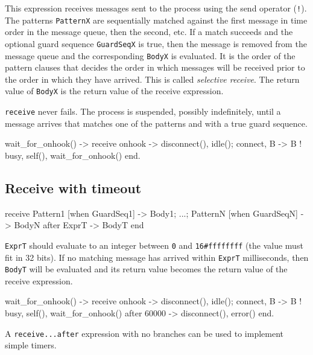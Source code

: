 This expression receives messages sent to the process using the send
operator (\texttt{!}). The patterns \texttt{PatternX} are sequentially
matched against the first message in time order in the message queue,
then the second, etc. If a match succeeds and the optional guard
sequence \texttt{GuardSeqX} is true, then the message is removed from
the message queue and the corresponding \texttt{BodyX} is
evaluated. It is the order of the pattern clauses that decides the
order in which messages will be received prior to the order in which
they have arrived. This is called \textit{selective receive}. The
return value of \texttt{BodyX} is the return value of the receive
expression.

\texttt{receive} never fails. The process is suspended, possibly
indefinitely, until a message arrives that matches one of the patterns
and with a true guard sequence.


\begin{erlang}
wait_for_onhook() ->
    receive
        onhook ->
            disconnect(),
            idle();
        {connect, B} ->
            B ! {busy, self()},
            wait_for_onhook()
    end.
\end{erlang}


\subsection{Receive with timeout}

\begin{erlang}
receive
    Pattern1 [when GuardSeq1] ->
        Body1;
        ...;
    PatternN [when GuardSeqN] ->
        BodyN
after
    ExprT ->
        BodyT
end
\end{erlang}

\texttt{ExprT} should evaluate to an integer between \texttt{0} and
\texttt{16\#ffffffff} (the value must fit in 32 bits). If no matching
message has arrived within \texttt{ExprT} milliseconds, then
\texttt{BodyT} will be evaluated and its return value becomes the
return value of the receive expression.

\begin{erlang}
wait_for_onhook() ->
    receive
        onhook ->
            disconnect(),
            idle();
        {connect, B} ->
            B ! {busy, self()},
            wait_for_onhook()
    after
        60000 ->
            disconnect(),
            error()
    end.
\end{erlang}

A \texttt{receive...after} expression with no branches can be used to
implement simple timers.

